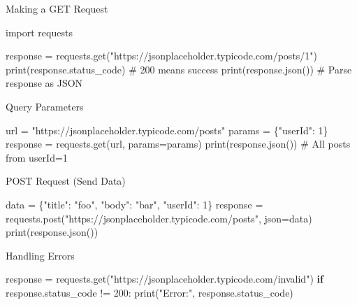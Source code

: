 \documentclass[
  letterpaper,
  DIV=11,
  numbers=noendperiod]{scrreprt}
\newenvironment{Shaded}{\begin{snugshade}}{\end{snugshade}}
\newcommand{\BuiltInTok}[1]{\textcolor[rgb]{0.00,0.23,0.31}{#1}}
\newcommand{\CommentTok}[1]{\textcolor[rgb]{0.37,0.37,0.37}{#1}}
\newcommand{\ControlFlowTok}[1]{\textcolor[rgb]{0.00,0.23,0.31}{\textbf{#1}}}
\newcommand{\DecValTok}[1]{\textcolor[rgb]{0.68,0.00,0.00}{#1}}
\newcommand{\ImportTok}[1]{\textcolor[rgb]{0.00,0.46,0.62}{#1}}
\newcommand{\NormalTok}[1]{\textcolor[rgb]{0.00,0.23,0.31}{#1}}
\newcommand{\OperatorTok}[1]{\textcolor[rgb]{0.37,0.37,0.37}{#1}}
\newcommand{\StringTok}[1]{\textcolor[rgb]{0.13,0.47,0.30}{#1}}
\begin{document}
Making a GET Request

\begin{Shaded}
\begin{Highlighting}[]
\ImportTok{import}\NormalTok{ requests}

\NormalTok{response }\OperatorTok{=}\NormalTok{ requests.get(}\StringTok{"https://jsonplaceholder.typicode.com/posts/1"}\NormalTok{)}
\BuiltInTok{print}\NormalTok{(response.status\_code)   }\CommentTok{\# 200 means success}
\BuiltInTok{print}\NormalTok{(response.json())        }\CommentTok{\# Parse response as JSON}
\end{Highlighting}
\end{Shaded}

Query Parameters

\begin{Shaded}
\begin{Highlighting}[]
\NormalTok{url }\OperatorTok{=} \StringTok{"https://jsonplaceholder.typicode.com/posts"}
\NormalTok{params }\OperatorTok{=}\NormalTok{ \{}\StringTok{"userId"}\NormalTok{: }\DecValTok{1}\NormalTok{\}}
\NormalTok{response }\OperatorTok{=}\NormalTok{ requests.get(url, params}\OperatorTok{=}\NormalTok{params)}
\BuiltInTok{print}\NormalTok{(response.json())   }\CommentTok{\# All posts from userId=1}
\end{Highlighting}
\end{Shaded}

POST Request (Send Data)

\begin{Shaded}
\begin{Highlighting}[]
\NormalTok{data }\OperatorTok{=}\NormalTok{ \{}\StringTok{"title"}\NormalTok{: }\StringTok{"foo"}\NormalTok{, }\StringTok{"body"}\NormalTok{: }\StringTok{"bar"}\NormalTok{, }\StringTok{"userId"}\NormalTok{: }\DecValTok{1}\NormalTok{\}}
\NormalTok{response }\OperatorTok{=}\NormalTok{ requests.post(}\StringTok{"https://jsonplaceholder.typicode.com/posts"}\NormalTok{, json}\OperatorTok{=}\NormalTok{data)}
\BuiltInTok{print}\NormalTok{(response.json())}
\end{Highlighting}
\end{Shaded}

Handling Errors

\begin{Shaded}
\begin{Highlighting}[]
\NormalTok{response }\OperatorTok{=}\NormalTok{ requests.get(}\StringTok{"https://jsonplaceholder.typicode.com/invalid"}\NormalTok{)}
\ControlFlowTok{if}\NormalTok{ response.status\_code }\OperatorTok{!=} \DecValTok{200}\NormalTok{:}
    \BuiltInTok{print}\NormalTok{(}\StringTok{"Error:"}\NormalTok{, response.status\_code)}
\end{Highlighting}
\end{Shaded}
\end{document}
